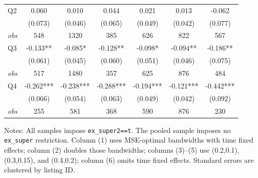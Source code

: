 \begin{table}[!htbp]
\begin{tabular}{lcccccc}
Q2 & 0.060 & 0.010 & 0.044 & 0.021 & 0.013 & -0.062 \\
 & (0.073) & (0.046) & (0.065) & (0.049) & (0.042) & (0.077) \\
\textit{obs} & 548 & 1320 & 385 & 626 & 822 & 567 \\
Q3 & -0.133** & -0.085* & -0.128** & -0.098* & -0.094** & -0.186** \\
 & (0.061) & (0.045) & (0.060) & (0.051) & (0.046) & (0.075) \\
\textit{obs} & 517 & 1480 & 357 & 625 & 876 & 484 \\
Q4 & -0.262*** & -0.238*** & -0.288*** & -0.194*** & -0.121*** & -0.442*** \\
 & (0.066) & (0.054) & (0.063) & (0.049) & (0.042) & (0.092) \\
\textit{obs} & 255 & 581 & 368 & 590 & 876 & 230 \\
\bottomrule
\end{tabular}
\begin{minipage}{0.98\textwidth}\footnotesize
Notes: All samples impose \texttt{ex\_super2==t}. The pooled sample imposes no \texttt{ex\_super} restriction. Column (1) uses MSE-optimal bandwidths with time fixed effects; column (2) doubles those bandwidths; columns (3)--(5) use (0.2,0.1), (0.3,0.15), and (0.4,0.2); column (6) omits time fixed effects. Standard errors are clustered by listing ID.
\end{minipage}
\end{table}

